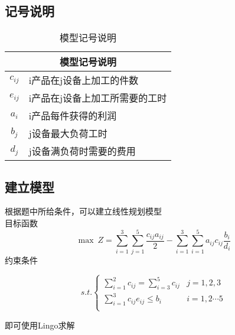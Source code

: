 \documentclass[nocover]{cumcmart}%
\begin{document}
\subsection{记号说明}
\begin{table}[!htbp]
    \centering
    \begin{tabular}{cl}
    \toprule
    \multicolumn{2}{c}{\large 模型记号说明}\\
    \midrule
    ${c_{ij}}$ &  i产品在j设备上加工的件数 \\
    ${e_{ij}}$ &  i产品在j设备上加工所需要的工时 \\
    ${a_i}$    &  i产品每件获得的利润 \\
    ${b_j}$    &  j设备最大负荷工时 \\
    ${d_j}$    &  j设备满负荷时需要的费用 \\
    \bottomrule
    \end{tabular}
    \caption{模型记号说明}
\end{table}

\subsection{建立模型}
    根据题中所给条件，可以建立线性规划模型 \\
    目标函数
    \[ \max \ Z = \sum_{i=1}^{3}\sum_{j=1}^{5} {\frac{c_{ij}a_{ij}}{2}} - 
    \sum_{i=1}^{3}\sum_{i=1}^{5}{a_{ij}c_{ij}\frac{b_{i}}{d_{i}}} \]
    约束条件
    
    \[ %
    s.t.
    \left\{  
    \begin{array}{ll}  
    \sum\limits_{i=1}^{2}{c_{ij}} = \sum\limits_{i=3}^{5}{c_{ij}} & j  = 1,2,3  \\ 
     \sum\limits_{i=1}^{3}{c_{ij}e_{ij}} \leqslant b_{i} & i = 1,2 \cdots 5 \\
    \end{array}  
    \right.
    \] %
    
    即可使用Lingo求解
\end{document}
